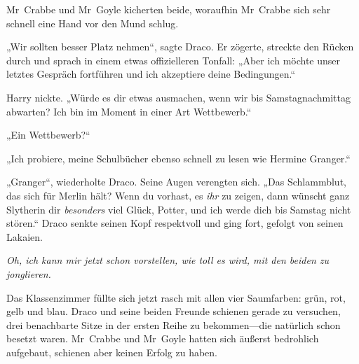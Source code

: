 Mr~Crabbe und Mr~Goyle kicherten beide, woraufhin Mr~Crabbe sich sehr schnell eine Hand vor den Mund schlug.

„Wir sollten besser Platz nehmen“, sagte Draco. Er zögerte, streckte den Rücken durch und sprach in einem etwas offizielleren Tonfall: „Aber ich möchte unser letztes Gespräch fortführen und ich akzeptiere deine Bedingungen.“

Harry nickte. „Würde es dir etwas ausmachen, wenn wir bis Samstagnachmittag abwarten? Ich bin im Moment in einer Art Wettbewerb.“

„Ein Wettbewerb?“

„Ich probiere, meine Schulbücher ebenso schnell zu lesen wie Hermine Granger.“

„Granger“, wiederholte Draco. Seine Augen verengten sich. „Das Schlammblut, das sich für Merlin hält? Wenn du vorhast, es \emph{ihr} zu zeigen, dann wünscht ganz Slytherin dir \emph{besonders} viel Glück, Potter, und ich werde dich bis Samstag nicht stören.“ Draco senkte seinen Kopf respektvoll und ging fort, gefolgt von seinen Lakaien.

\emph{Oh, ich kann mir jetzt schon vorstellen, wie toll es wird, mit den beiden zu jonglieren.}

Das Klassenzimmer füllte sich jetzt rasch mit allen vier Saumfarben: grün, rot, gelb und blau. Draco und seine beiden Freunde schienen gerade zu versuchen, drei benachbarte Sitze in der ersten Reihe zu bekommen—die natürlich schon besetzt waren. Mr~Crabbe und Mr~Goyle hatten sich äußerst bedrohlich aufgebaut, schienen aber keinen Erfolg zu haben.

